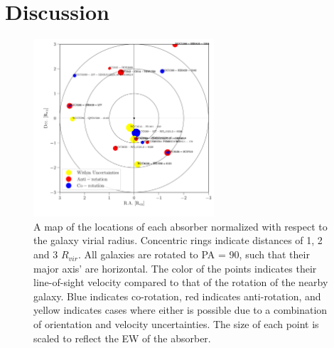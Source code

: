 \documentclass[iop]{emulateapj-rtx4}
\begin{document}
\section{Discussion}


\begin{figure}[ht!]
        \centering
        \vspace{0pt}
        \includegraphics[width=0.60\textwidth]{SALT_map2.pdf}
        \caption{\small{A map of the locations of each absorber normalized with respect to the galaxy virial radius. Concentric rings indicate distances of 1, 2 and 3 $R_{vir}$. All galaxies are rotated to PA = 90, such that their major axis' are horizontal. The color of the points indicates their line-of-sight velocity compared to that of the rotation of the nearby galaxy. Blue indicates co-rotation, red indicates anti-rotation, and yellow indicates cases where either is possible due to a combination of orientation and velocity uncertainties. The size of each point is scaled to reflect the EW of the absorber. }}
        \label{map}
\end{figure}


\end{document}
